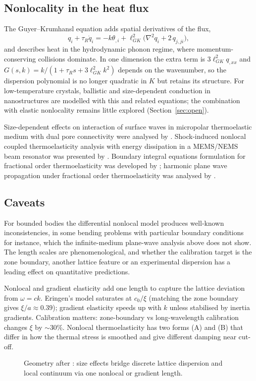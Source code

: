 \subsection{Nonlocality in the heat flux}
The Guyer--Krumhansl equation \citep{GuyerKrumhansl1966,GuyerKrumhansl1966II} adds spatial derivatives of the flux,
\begin{equation}
q_i+\tau_R\dot q_i=-k\theta_{,i}+\ell_{GK}^2\bigl(\nabla^2q_i+2\,q_{j,ji}\bigr),
\end{equation}
and describes heat in the hydrodynamic phonon regime, where momentum-conserving collisions dominate. In one dimension the extra term is $3\ell_{GK}^2q_{,xx}$ and $G(s,k)=k/(1+\tau_Rs+3\ell_{GK}^2k^2)$ depends on the wavenumber, so the dispersion polynomial is no longer quadratic in $K$ but retains its structure. For low-temperature crystals, ballistic and size-dependent conduction in nanostructures are modelled with this and related equations; the combination with elastic nonlocality remains little explored (Section~\ref{sec:open}).

Size-dependent effects on interaction of surface waves in micropolar thermoelastic medium with dual pore connectivity were analysed by \citep{Das2024}. Shock-induced nonlocal coupled thermoelasticity analysis with energy dissipation in a MEMS/NEMS beam resonator was presented by \citep{Hosseini2017}. Boundary integral equations formulation for fractional order thermoelasticity was developed by \citep{Tiwari2014}; harmonic plane wave propagation under fractional order thermoelasticity was analysed by \citep{Tiwari2015}.

\subsection{Caveats}
For bounded bodies the differential nonlocal model produces well-known inconsistencies, in some bending problems with particular boundary conditions for instance, which the infinite-medium plane-wave analysis above does not show. The length scales are phenomenological, and whether the calibration target is the zone boundary, another lattice feature or an experimental dispersion has a leading effect on quantitative predictions.

\begin{summarybox}[Summary]
Nonlocal and gradient elasticity add one length to capture the lattice deviation from $\omega=ck$. Eringen's model saturates at $c_0/\xi$ (matching the zone boundary gives $\xi/a\approx0.39$); gradient elasticity speeds up with $k$ unless stabilised by inertia gradients. Calibration matters: zone-boundary vs long-wavelength calibration changes $\xi$ by $\sim$30\%. Nonlocal thermoelasticity has two forms (A) and (B) that differ in how the thermal stress is smoothed and give different damping near cut-off.
\end{summarybox}

\begin{figure}[t!]\centering\small

\caption{Geometry after \citep{BornKarman1912,Eringen1972}: size effects bridge discrete lattice dispersion and local continuum via one nonlocal or gradient length.}\label{fig:size-geo}
\end{figure}
